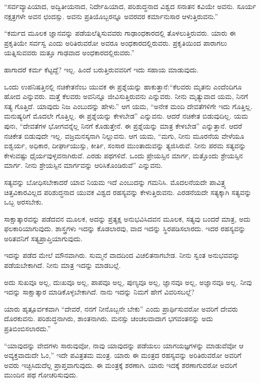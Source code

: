 \vskip 6pt

“ಸರ್ವವ್ಯಾಪಿಯಾದ, ಅದ್ವಿತೀಯನಾದ, ನಿರ್ದೇಹಿಯಾದ, ಪರಿಶುದ್ಧನಾದ ವಿಶ್ವದ ಸನಾತನ ಕವಿಯೇ ಅವನು. ಸೂರ್ಯ ನಕ್ಷತ್ರಗಳೇ ಅವನ ಛಂದಸ್ಸು. ಅವನು ಪ್ರತಿಯೊಬ್ಬರನ್ನೂ ಅವರವರ ಕರ್ಮಾನುಸಾರ ಆಳುತ್ತಿರುವನು.”

\vskip 6pt

“ಕರ್ಮದ ಮೂಲಕ ಜ್ಞಾನವನ್ನು ಪಡೆಯಲೆತ್ನಿಸುವವರು ಗಾಢಾಂಧಕಾರದಲ್ಲಿ ತೊಳಲುತ್ತಿರುವರು. ಯಾರು ಈ ಪ್ರಕೃತಿಯೇ ಸರ್ವಸ್ವ ಎಂದು ಅರಿತಿರುವರೋ ಅವರೂ ಅಂಧಕಾರದಲ್ಲಿರುವರು. ಪ್ರಕೃತಿಯಿಂದ ಪಾರಾಗಲು ಯತ್ನಿಸುವವರು ಮತ್ತೂ ಗಾಢವಾದ ಅಂಧಕಾರದಲ್ಲಿರುವರು.”

\vskip 6pt

ಹಾಗಾದರೆ ಕರ್ಮ ಕೆಟ್ಟದ್ದೆ? ಇಲ್ಲ. ಹಿಂದೆ ಬರುತ್ತಿರುವವರಿಗೆ ಇದು ಸಹಾಯ ಮಾಡುವುದು.

\vskip 6pt

ಒಂದು ಉಪನಿಷತ್ತಿನಲ್ಲಿ ನಚಿಕೇತನೆಂಬ ಯುವಕ ಈ ಪ್ರಶ್ನೆಯನ್ನು ಹಾಕುತ್ತಾನೆ:\break “ಕೆಲವರು ಮೃತನು ಎಂದೆಂದಿಗೂ ಹೋದ ಎನ್ನುವರು. ಮತ್ತೆ ಕೆಲವರು ಅವನಿನ್ನೂ ಜೀವಿಸುತ್ತಿರುವನು ಎನ್ನುವರು. ನೀನು ಮೃತ್ಯುವಾದ ಯಮ, ನಿನಗೆ ಸತ್ಯ ಗೊತ್ತಿದೆ. ಯಾವುದು ನಿಜ ಎಂಬುದನ್ನು ಹೇಳು.” ಆಗ ಯಮ, “ಅನೇಕ ಮಂದಿ ದೇವತೆಗಳಿಗೇ ಇದು ಗೊತ್ತಿಲ್ಲ. ಮನುಷ್ಯರಿಗೆ ಮೊದಲೇ ಗೊತ್ತಿಲ್ಲ. ಈ ಪ್ರಶ್ನೆಯನ್ನು ಕೇಳಬೇಡ” ಎನ್ನುವನು. ಆದರೆ ನಚಿಕೇತ ಬಿಡುವುದಿಲ್ಲ. ಯಮ ಪುನಃ, “ದೇವತೆಗಳ ಭೋಗವನ್ನೆಲ್ಲ ನಿನಗೆ ಕೊಡುತ್ತೇನೆ. ಈ ಪ್ರಶ್ನೆಯನ್ನು ಮಾತ್ರ ಕೇಳಬೇಡ” ಎನ್ನುತ್ತಾನೆ. ಆದರೆ ನಚಿಕೇತ ಬಿಡುವುದೇ ಇಲ್ಲ. ವಜ್ರಮನಸ್ಕನಾಗಿ ನಿಲ್ಲುವನು. ಆಗ ಯಮ, “ಮಗು, ನೀನು ಮೂರನೆಯ ವೇಳೆಯೂ ಐಶ್ವರ್ಯ, ಅಧಿಕಾರ, ದೀರ್ಘಾಯುಸ್ಸು, ಕೀರ್ತಿ, ಸಂಸಾರ ಮುಂತಾದುವನ್ನು ತ್ಯಜಿಸಿರುವೆ. ನೀನು ಪರಮ ಸತ್ಯವನ್ನು ಕೇಳುವಷ್ಟು ಧೈರ್ಯವುಳ್ಳವನಾಗಿರುವೆ. ಎರಡು ಪಥಗಳಿವೆ. ಒಂದು ಪ್ರೇಯಸ್ಸಿನ ಮಾರ್ಗ, ಮತ್ತೊಂದು ಶ್ರೇಯಸ್ಸಿನ ಮಾರ್ಗ. ನೀನು ಶ್ರೇಯಸ್ಸಿನ ಮಾರ್ಗವನ್ನು ಆರಿಸಿಕೊಂಡಿರುವೆ” ಎನ್ನುವನು.

\vskip 6pt

ಸತ್ಯವನ್ನು ಬೋಧಿಸಬೇಕಾದರೆ ಯಾವ ನಿಯಮ ಇದೆ ಎಂಬುದನ್ನು ಗಮನಿಸಿ. ಮೊದಲನೆಯದೇ ಪಾವಿತ್ರ್ಯ ಚಿತ್ತವಿಕಾರವಿಲ್ಲದ ಪರಿಶುದ್ಧನಾದ ಯುವಕ ವಿಶ್ವದ ರಹಸ್ಯವನ್ನು ಕೇಳುತ್ತಿರುವನು. ಎರಡನೆಯದೇ ಸತ್ಯಕ್ಕಾಗಿ ಸತ್ಯವನ್ನು ಒಬ್ಬ ಅರಸಬೇಕು.

\vskip 6pt

ಸಾಕ್ಷಾತ್ಕಾರವನ್ನು ಪಡೆದವನ ಮೂಲಕ, ಅದನ್ನು ಪ್ರತ್ಯಕ್ಷ ಅನುಭವಿಸಿದವನ ಮೂಲಕ, ಸತ್ಯವು ಬಂದರೆ ಮಾತ್ರ, ಅದು ಫಲಕಾರಿಯಾಗುವುದು. ಶಾಸ್ತ್ರಗಳು ಇದನ್ನು ಕೊಡಲಾರವು, ವಾದ ಇದನ್ನು ಸ್ಥಿರಪಡಿಸಲಾರದು. ಇದರ ರಹಸ್ಯವನ್ನು ಅರಿತವನಿಗೆ ಸತ್ಯ\break ಪ್ರಾಪ್ತಿಯಾಗುವುದು.

\vskip 6pt

ಇದನ್ನು ಪಡೆದ ಮೇಲೆ ಮೌನವಾಗಿರು. ಸುಮ್ಮನೆ ವಾದದಿಂದ ವಿಚಲಿತನಾಗಬೇಡ. ನೀನು ಸ್ವಂತ ಅನುಭವವನ್ನು ಪಡೆಯಬೇಕಾಗಿದೆ. ನೀನು ಮಾತ್ರ ಇದನ್ನು ಮಾಡಬಲ್ಲೆ.

\vskip 6pt

ಅದು ಸುಖವೂ ಅಲ್ಲ, ದುಃಖವೂ ಅಲ್ಲ, ಪಾಪವೂ ಅಲ್ಲ, ಪುಣ್ಯವೂ ಅಲ್ಲ, ಜ್ಞಾನವೂ ಅಲ್ಲ, ಅಜ್ಞಾನವೂ ಅಲ್ಲ. ನೀವು ಇದನ್ನು ಸಾಕ್ಷಾತ್ಕಾರ ಮಾಡಿಕೊಳ್ಳಬೇಕಾಗಿದೆ. ನಾನು ಇದನ್ನು ನಿಮಗೆ ಹೇಗೆ ವಿವರಿಸಬಲ್ಲೆ?

\vskip 6pt

ಯಾರು ಹೃತ್ಪೂರ್ವಕವಾಗಿ “ದೇವರೆ, ನನಗೆ ನೀನೊಬ್ಬನೇ ಬೇಕು” ಎಂದು ಪ್ರಾರ್ಥಿಸುವರೋ ಅವರಿಗೆ ದೇವರು ದೊರಕುವನು. ಪರಿಶುದ್ಧನಾಗಿರು, ಶಾಂತನಾಗಿರು. ಮನಸ್ಸು ಚಂಚಲವಾದಾಗ ಭಗವಂತನನ್ನು ಅದು ಪ್ರತಿಬಿಂಬಿಸಲಾರದು.”

\vskip 6pt

“ಯಾವುದನ್ನು ವೇದಗಳು ಸಾರುವುವೋ, ನಾವು ಯಾವುದನ್ನು ಪಡೆಯಲು ಯಾಗಯಜ್ಞಗಳನ್ನು ಮಾಡುವೆವೋ ಆ ಅವ್ಯಕ್ತವಾದುದೇ ಓಂ,” ಇದೇ ಪವಿತ್ರತಮ ಮಂತ್ರ. ಯಾರು ಈ ಮಂತ್ರದ ರಹಸ್ಯವನ್ನು ಅರಿತಿರುವರೋ ಅವರಿಗೆ ಅವರು ಇಚ್ಛಿಸಿದುದೆಲ್ಲ ಪ್ರಾಪ್ತವಾಗುವುದು. ಈ ಮಂತ್ರಕ್ಕೆ ಶರಣಾಗಿ. ಯಾರು ಇದಕ್ಕೆ ಶರಣಾಗುವರೋ ಅವರಿಗೆ ಮುಂದಿನ ಪಥ ಗೋಚರಿಸುವುದು.

